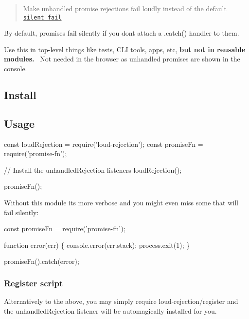 \begin{quote}
Make unhandled promise rejections fail loudly instead of the default \href{https://gist.github.com/benjamingr/0237932cee84712951a2}{\tt silent fail} \end{quote}


By default, promises fail silently if you don\textquotesingle{}t attach a {\ttfamily .catch()} handler to them.

Use this in top-\/level things like tests, C\+LI tools, apps, etc, {\bfseries but not in reusable modules.}~\newline
 Not needed in the browser as unhandled promises are shown in the console.

\subsection*{Install}




\subsection*{Usage}


\begin{DoxyCode}
const loudRejection = require('loud-rejection');
const promiseFn = require('promise-fn');

// Install the unhandledRejection listeners
loudRejection();

promiseFn();
\end{DoxyCode}


Without this module it\textquotesingle{}s more verbose and you might even miss some that will fail silently\+:


\begin{DoxyCode}
const promiseFn = require('promise-fn');

function error(err) \{
    console.error(err.stack);
    process.exit(1);
\}

promiseFn().catch(error);
\end{DoxyCode}


\subsubsection*{Register script}

Alternatively to the above, you may simply require {\ttfamily loud-\/rejection/register} and the unhandled\+Rejection listener will be automagically installed for you.


